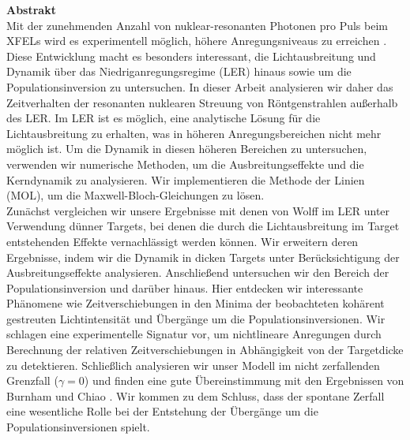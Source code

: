   \vfill
  \vspace{1cm}
    \noindent\sffamily\textbf{Abstrakt}
	\\[1em]\normalfont\normalsize
Mit der zunehmenden Anzahl von nuklear-resonanten Photonen pro Puls beim XFELs \cite{scientific_opp_XFEL} wird es experimentell möglich, höhere Anregungsniveaus zu erreichen \cite{Shvydko2023}. Diese Entwicklung macht es besonders interessant, die Lichtausbreitung und Dynamik über das Niedriganregungsregime (LER) hinaus sowie um die Populationsinversion zu untersuchen. In dieser Arbeit analysieren wir daher das Zeitverhalten der resonanten nuklearen Streuung von Röntgenstrahlen außerhalb des LER. Im LER ist es möglich, eine analytische Lösung für die Lichtausbreitung zu erhalten, was in höheren Anregungsbereichen nicht mehr möglich ist. Um die Dynamik in diesen höheren Bereichen zu untersuchen, verwenden wir numerische Methoden, um die Ausbreitungseffekte und die Kerndynamik zu analysieren. Wir implementieren die Methode der Linien (MOL), um die Maxwell-Bloch-Gleichungen zu lösen.\\

Zunächst vergleichen wir unsere Ergebnisse mit denen von Wolff \cite{wolff2023characterization} im LER unter Verwendung dünner Targets, bei denen die durch die Lichtausbreitung im Target entstehenden Effekte vernachlässigt werden können. Wir erweitern deren Ergebnisse, indem wir die Dynamik in dicken Targets unter Berücksichtigung der Ausbreitungseffekte analysieren. Anschließend untersuchen wir den Bereich der Populationsinversion und darüber hinaus. Hier entdecken wir interessante Phänomene wie Zeitverschiebungen in den Minima der beobachteten kohärent gestreuten Lichtintensität und Übergänge um die Populationsinversionen. Wir schlagen eine experimentelle Signatur vor, um nichtlineare Anregungen durch Berechnung der relativen Zeitverschiebungen in Abhängigkeit von der Targetdicke zu detektieren. Schließlich analysieren wir unser Modell im nicht zerfallenden Grenzfall ($\gamma = 0$) und finden eine gute Übereinstimmung mit den Ergebnissen von Burnham und Chiao \cite{BURNHAM1969}. Wir kommen zu dem Schluss, dass der spontane Zerfall eine wesentliche Rolle bei der Entstehung der Übergänge um die Populationsinversionen spielt.
